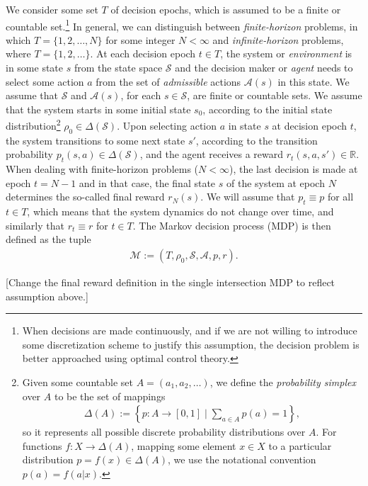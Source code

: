 \documentclass[11pt,a4paper]{article}
\theoremstyle{remark}
\newcommand\note[1]{{\color{Navy}\noindent\scriptsize#1}}
\begin{document}
We consider some set $T$ of decision epochs, which is assumed to be a finite or
countable set.\footnote{When decisions are made continuously, and if we are not
  willing to introduce some discretization scheme to justify this assumption,
  the decision problem is better approached using optimal control
  theory.}
%
In general, we can distinguish between \emph{finite-horizon} problems, in which
$T = \{1, 2, \dots, N\}$ for some integer $N < \infty$ and
\emph{infinite-horizon} problems, where $T = \{1, 2, \dots\}$.
%
At each decision epoch $t \in T$, the system or \emph{environment} is in some
state $s$ from the state space $\mathcal{S}$ and the decision maker or \emph{agent}
needs to select some action $a$ from the set of \emph{admissible} actions
$\mathcal{A}(s)$ in this state.
%
We assume that $\mathcal{S}$ and $\mathcal{A}(s)$, for each $s \in \mathcal{S}$,
are finite or countable sets.
%
We assume that the system starts in some initial state $s_0$, according to the
initial state distribution\footnote{Given some countable set
  $A = (a_1, a_2, \dots )$, we define the \emph{probability simplex} over $A$ to
  be the set of mappings
\begin{align*}
  \Delta(A) := \left\{ p : A \rightarrow [0, 1] \mid \sum_{a \in A} p(a) = 1 \right\} ,
\end{align*}
so it represents all possible discrete probability distributions over $A$. For
functions $f : X \rightarrow \Delta(A)$, mapping some element $x \in X$ to a
particular distribution $p = f(x) \in \Delta(A)$, we use the notational
convention $p(a) = f(a | x )$.} $\rho_0 \in \Delta(\mathcal{S})$.
%
Upon selecting action $a$ in state $s$ at decision epoch $t$, the system
transitions to some next state $s'$, according to the transition probability
$p_t(s, a) \in \Delta(\mathcal{S})$, and the agent receives a reward
$r_t(s, a, s') \in \mathbb{R}$.
%
When dealing with finite-horizon problems ($N < \infty$), the last decision is
made at epoch $t = N - 1$ and in that case, the final state $s$ of the system at
epoch $N$ determines the so-called final reward $r_N(s)$.
%
We will assume that $p_t \equiv p$ for all $t \in T$, which means that the system
dynamics do not change over time, and similarly that $r_t \equiv r$ for $t \in T$.
%
The Markov decision process (MDP) is then defined as the tuple
\begin{align}
  \mathcal{M} := (T, \rho_0, \mathcal{S}, \mathcal{A}, p, r) .
\end{align}

\note{[Change the final reward definition in the single intersection MDP to
  reflect assumption above.]}
\end{document}
